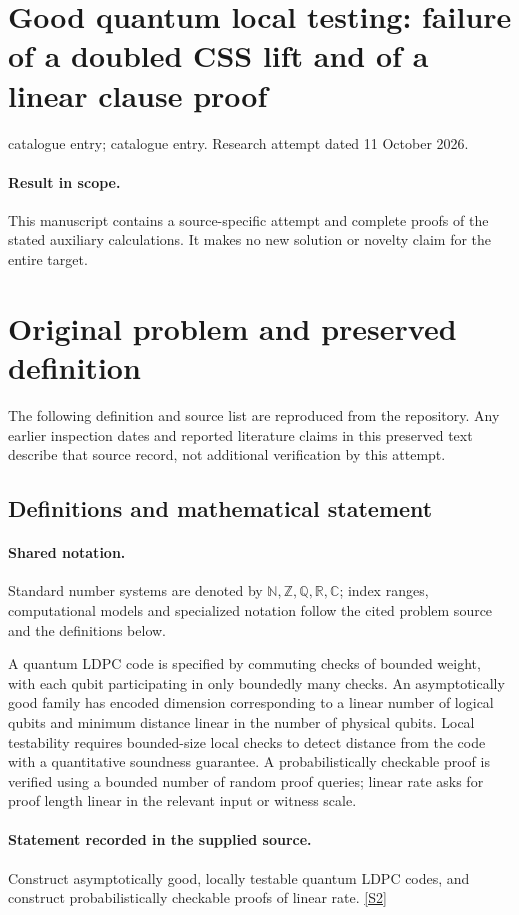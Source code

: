 \documentclass[11pt]{article}
\begin{document}
\section*{Good quantum local testing: failure of a doubled CSS lift and of a linear clause proof}
\noindent catalogue entry; catalogue entry. Research attempt dated 11 October 2026.
\paragraph{Result in scope.}This manuscript contains a source-specific attempt and complete proofs of the stated auxiliary calculations. It makes no new solution or novelty claim for the entire target.
\section{Original problem and preserved definition}
The following definition and source list are reproduced from the repository. Any earlier inspection dates and reported literature claims in this preserved text describe that source record, not additional verification by this attempt.
\subsection{Definitions and mathematical statement}

\paragraph{Shared notation.}Standard number systems are denoted by $\mathbb N,\mathbb Z,\mathbb Q,\mathbb R,\mathbb C$; index ranges, computational models and specialized notation follow the cited problem source and the definitions below.


A quantum LDPC code is specified by commuting checks of bounded weight, with each qubit participating in only boundedly many checks. An asymptotically good family has encoded dimension corresponding to a linear number of logical qubits and minimum distance linear in the number of physical qubits. Local testability requires bounded-size local checks to detect distance from the code with a quantitative soundness guarantee. A probabilistically checkable proof is verified using a bounded number of random proof queries; linear rate asks for proof length linear in the relevant input or witness scale.
\paragraph{Statement recorded in the supplied source.}
Construct asymptotically good, locally testable quantum LDPC codes, and construct probabilistically checkable proofs of linear rate. \href{https://doi.org/10.4171/owr/2021/54}{[S2]}
\end{document}
